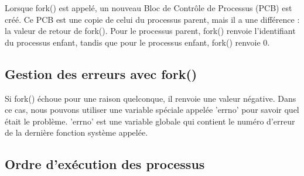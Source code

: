 \documentclass[12pt]{report}
\begin{document}
 Lorsque fork() est appelé, un nouveau Bloc de Contrôle de Processus (PCB) est créé. Ce PCB est une copie de celui du processus parent, mais il a une différence : la valeur de retour de fork(). Pour le processus parent, fork() renvoie l'identifiant du processus enfant, tandis que pour le processus enfant, fork() renvoie 0. 

 \subsection{Gestion des erreurs avec fork()} 

 Si fork() échoue pour une raison quelconque, il renvoie une valeur négative. Dans ce cas, nous pouvons utiliser une variable spéciale appelée 'errno' pour savoir quel était le problème. 'errno' est une variable globale qui contient le numéro d'erreur de la dernière fonction système appelée. 

 \subsection{Ordre d'exécution des processus} 
\end{document}
